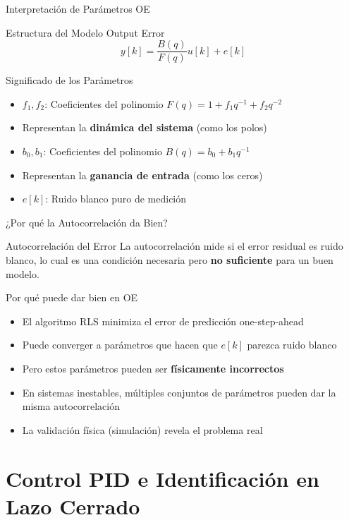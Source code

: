 \documentclass{beamer}
\begin{document}
\begin{frame}{Interpretación de Parámetros OE}
\begin{block}{Estructura del Modelo Output Error}
\[
y[k] = \frac{B(q)}{F(q)} u[k] + e[k]
\]
\end{block}

\begin{block}{Significado de los Parámetros}
\begin{itemize}
\item $f_1, f_2$: Coeficientes del polinomio $F(q) = 1 + f_1 q^{-1} + f_2 q^{-2}$
\item Representan la \textbf{dinámica del sistema} (como los polos)
\item $b_0, b_1$: Coeficientes del polinomio $B(q) = b_0 + b_1 q^{-1}$
\item Representan la \textbf{ganancia de entrada} (como los ceros)
\item $e[k]$: Ruido blanco puro de medición
\end{itemize}
\end{block}
\end{frame}

\begin{frame}{¿Por qué la Autocorrelación da Bien?}
\begin{block}{Autocorrelación del Error}
La autocorrelación mide si el error residual es ruido blanco, lo cual es una condición necesaria pero \textbf{no suficiente} para un buen modelo.
\end{block}

\begin{block}{Por qué puede dar bien en OE}
\begin{itemize}
\item El algoritmo RLS minimiza el error de predicción one-step-ahead
\item Puede converger a parámetros que hacen que $e[k]$ parezca ruido blanco
\item Pero estos parámetros pueden ser \textbf{físicamente incorrectos}
\item En sistemas inestables, múltiples conjuntos de parámetros pueden dar la misma autocorrelación
\item La validación física (simulación) revela el problema real
\end{itemize}
\end{block}
\end{frame}

\section{Control PID e Identificación en Lazo Cerrado}
\end{document}
